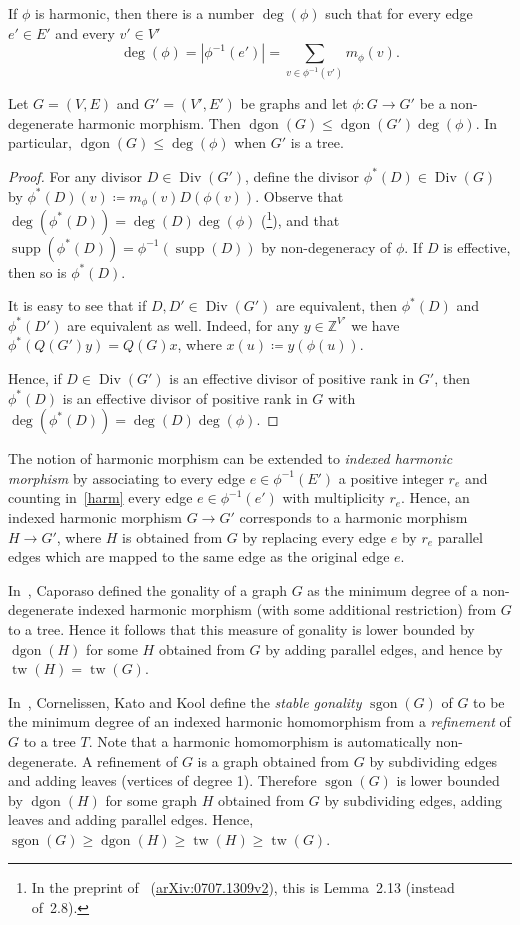\documentclass[ALCO,ThmDefs,Unicode,epreuves]{cedram}
\newcommand{\Z}{\ensuremath{\mathbb{Z}}}
\DeclareMathOperator{\tw}{tw}
\DeclareMathOperator{\Div}{Div}
\DeclareMathOperator{\dgon}{dgon}
\DeclareMathOperator{\sgon}{sgon}
\DeclareMathOperator{\supp}{supp}
\begin{document}
\noindent If $\phi$ is harmonic, then there is a number $\deg(\phi)$ such that for every edge $e'\in E'$ and every $v'\in V'$
\[
\deg(\phi)=|\phi^{-1}(e')|=\sum_{v\in \phi^{-1}(v')}m_\phi(v).
\]

\begin{lemma}
Let $G=(V,E)$ and $G'=(V',E')$ be graphs and let $\phi:G\to G'$ be a non-degenerate harmonic morphism. Then $\dgon(G)\leq \dgon(G')\deg(\phi)$. In particular, $\dgon(G)\leq \deg(\phi)$ when $G'$ is a tree.
\end{lemma}
\begin{proof}
For any divisor $D\in \Div(G')$, define the divisor $\phi^*(D)\in \Div(G)$ by $\phi^*(D)(v)\coloneqq m_\phi(v)D(\phi(v))$. Observe that $\deg(\phi^*(D))=\deg(D)\deg(\phi)$ (\cf \cite[Lemma~2.8]{BakerNorine2009}\footnote{In the preprint of~\cite{BakerNorine2009} (\cf \href{https://arxiv.org/abs/0707.1309v2}{arXiv:0707.1309v2}), this is Lemma~2.13 (instead of~2.8).}), and that $\supp(\phi^*(D)) = \phi^{-1}(\supp(D))$ by non-degeneracy of $\phi$. If $D$ is effective, then so is $\phi^*(D)$. 

It is easy to see that if $D,D'\in \Div(G')$ are equivalent, then $\phi^*(D)$ and $\phi^*(D')$ are equivalent as well. Indeed, for any $y\in \Z^{V'}$ we have $\phi^*(Q(G')y)=Q(G)x$, where $x(u)\coloneqq y(\phi(u))$.

Hence, if $D\in\Div(G')$ is an effective divisor of positive rank in $G'$, then $\phi^*(D)$ is an effective divisor of positive rank in $G$ with $\deg(\phi^*(D))=\deg(D)\deg(\phi)$. 
\end{proof} 
 
The notion of harmonic morphism can be extended to \emph{indexed harmonic morphism} by associating to every edge $e\in \phi^{-1}(E')$ a positive integer $r_e$ and counting in~\eqref{harm} every edge $e\in \phi^{-1}(e')$ with multiplicity $r_e$. Hence, an indexed harmonic morphism $G\to G'$ corresponds to a harmonic morphism $H\to G'$, where $H$ is obtained from $G$ by replacing every edge $e$ by $r_e$ parallel edges which are mapped to the same edge as the original edge $e$.

In~\cite{Caporaso2012}, Caporaso defined the gonality of a graph $G$ as the minimum degree of a non-degenerate indexed harmonic morphism (with some additional restriction) from $G$ to a tree. Hence it follows that this measure of gonality is lower bounded by $\dgon(H)$ for some $H$ obtained from $G$ by adding parallel edges, and hence by $\tw(H)=\tw(G)$.

In~\cite{CornelissenKatoKool2012}, Cornelissen, Kato and Kool define the \emph{stable gonality} $\sgon(G)$ of $G$ to be the minimum degree of an indexed harmonic homomorphism from a \emph{refinement} of $G$ to a tree $T$. Note that a harmonic homomorphism is automatically non-degenerate. A refinement of $G$ is a graph obtained from $G$ by subdividing edges and adding leaves (vertices of degree 1). Therefore $\sgon(G)$ is lower bounded by $\dgon(H)$ for some graph $H$ obtained from $G$ by subdividing edges, adding leaves and adding parallel edges. Hence, $\sgon(G)\geq \dgon(H)\geq \tw(H)\geq \tw(G)$.
\end{document}
